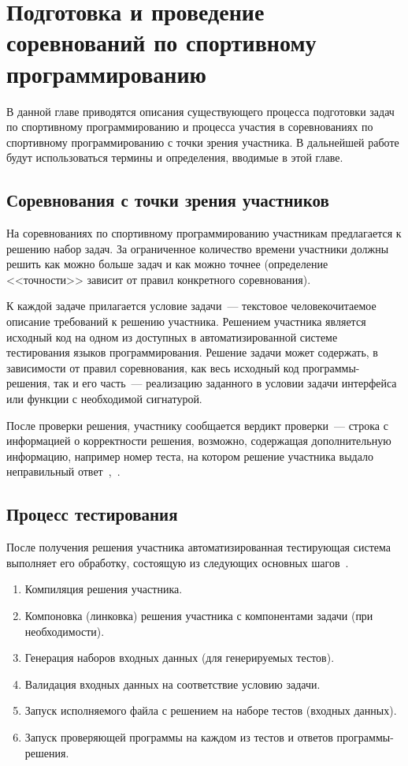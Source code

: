 \documentclass[times,specification,annotation]{style/itmo-student-thesis/itmo-student-thesis}
\begin{document}
\chapter{Подготовка и проведение соревнований по спортивному программированию}

В данной главе приводятся описания существующего процесса подготовки задач по спортивному программированию и процесса участия в соревнованиях по спортивному программированию с точки зрения участника. В дальнейшей работе будут использоваться термины и определения, вводимые в этой главе.

\section{Соревнования с точки зрения участников}

На соревнованиях по спортивному программированию участникам предлагается к решению набор задач. За ограниченное количество времени участники должны решить как можно больше задач и как можно точнее (определение <<точности>> зависит от правил конкретного соревнования).

К каждой задаче прилагается условие задачи~--- текстовое человекочитаемое описание требований к решению участника. Решением участника является исходный код на одном из доступных в автоматизированной системе тестирования языков программирования. Решение задачи может содержать, в зависимости от правил соревнования, как весь исходный код программы-решения, так и его часть~--- реализацию заданного в условии задачи интерфейса или функции с необходимой сигнатурой.

После проверки решения, участнику сообщается вердикт проверки~--- строка с информацией о корректности решения, возможно, содержащая дополнительную информацию, например номер теста, на котором решение участника выдало неправильный ответ~\cite{codeforces-rules},~\cite{nerc-rules}.

\section{Процесс тестирования}

После получения решения участника автоматизированная тестирующая система выполняет его обработку, состоящую из следующих основных шагов~\cite{roi-regionals-requirements}.

\begin{enumerate}[leftmargin=1.75cm]
    \item Компиляция решения участника.
    \item Компоновка (линковка) решения участника с компонентами задачи (при необходимости).
    \item Генерация наборов входных данных (для генерируемых тестов).
    \item Валидация входных данных на соответствие условию задачи.
    \item Запуск исполняемого файла с решением на наборе тестов (входных данных).
    \item Запуск проверяющей программы на каждом из тестов и ответов программы-решения.
\end{enumerate}
\end{document}
